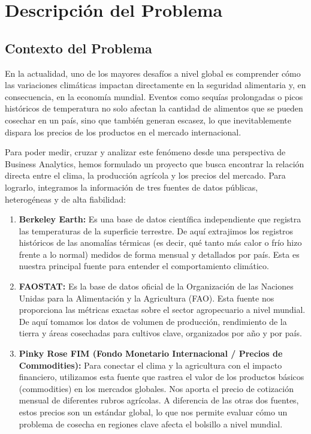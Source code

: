 \documentclass[12pt,letterpaper]{article}
\begin{document}
{

}

\newpage

\justifying
\section*{Descripción del Problema}

\subsection*{Contexto del Problema}

\noindent En la actualidad, uno de los mayores desafíos a nivel global es comprender cómo las variaciones climáticas impactan directamente en la seguridad alimentaria y, en consecuencia, en la economía mundial. Eventos como sequías prolongadas o picos históricos de temperatura no solo afectan la cantidad de alimentos que se pueden cosechar en un país, sino que también generan escasez, lo que inevitablemente dispara los precios de los productos en el mercado internacional.

\noindent Para poder medir, cruzar y analizar este fenómeno desde una perspectiva de Business Analytics, hemos formulado un proyecto que busca encontrar la relación directa entre el clima, la producción agrícola y los precios del mercado. Para lograrlo, integramos la información de tres fuentes de datos públicas, heterogéneas y de alta fiabilidad:

\begin{enumerate}
    \item \textbf{Berkeley Earth:} Es una base de datos científica independiente que registra las temperaturas de la superficie terrestre. De aquí extrajimos los registros históricos de las anomalías térmicas (es decir, qué tanto más calor o frío hizo frente a lo normal) medidos de forma mensual y detallados por país. Esta es nuestra principal fuente para entender el comportamiento climático.
    \item \textbf{FAOSTAT:} Es la base de datos oficial de la Organización de las Naciones Unidas para la Alimentación y la Agricultura (FAO). Esta fuente nos proporciona las métricas exactas sobre el sector agropecuario a nivel mundial. De aquí tomamos los datos de volumen de producción, rendimiento de la tierra y áreas cosechadas para cultivos clave, organizados por año y por país.
    \item \textbf{Pinky Rose FIM (Fondo Monetario Internacional / Precios de Commodities):} Para conectar el clima y la agricultura con el impacto financiero, utilizamos esta fuente que rastrea el valor de los productos básicos (commodities) en los mercados globales. Nos aporta el precio de cotización mensual de diferentes rubros agrícolas. A diferencia de las otras dos fuentes, estos precios son un estándar global, lo que nos permite evaluar cómo un problema de cosecha en regiones clave afecta el bolsillo a nivel mundial.
\end{enumerate}
\end{document}
